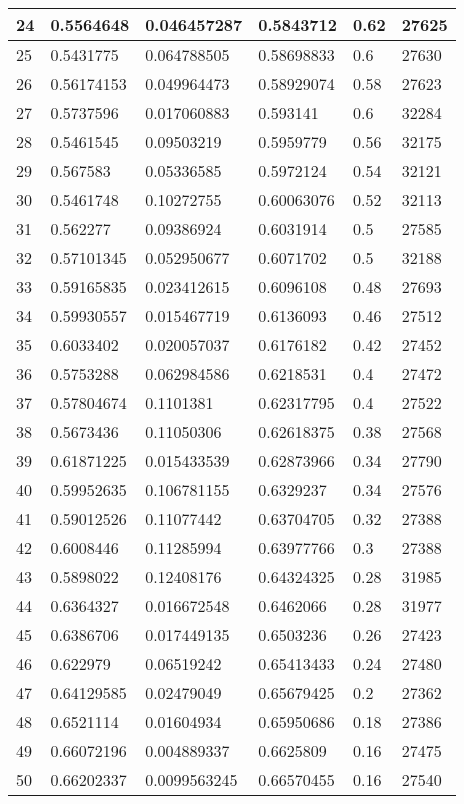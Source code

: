 \begin{longtable}{|l|l|l|l|l|l|}
24 & 0.5564648 & 0.046457287 & 0.5843712 & 0.62 & 27625 \\ \hline 
25 & 0.5431775 & 0.064788505 & 0.58698833 & 0.6 & 27630 \\ \hline 
26 & 0.56174153 & 0.049964473 & 0.58929074 & 0.58 & 27623 \\ \hline 
27 & 0.5737596 & 0.017060883 & 0.593141 & 0.6 & 32284 \\ \hline 
28 & 0.5461545 & 0.09503219 & 0.5959779 & 0.56 & 32175 \\ \hline 
29 & 0.567583 & 0.05336585 & 0.5972124 & 0.54 & 32121 \\ \hline 
30 & 0.5461748 & 0.10272755 & 0.60063076 & 0.52 & 32113 \\ \hline 
31 & 0.562277 & 0.09386924 & 0.6031914 & 0.5 & 27585 \\ \hline 
32 & 0.57101345 & 0.052950677 & 0.6071702 & 0.5 & 32188 \\ \hline 
33 & 0.59165835 & 0.023412615 & 0.6096108 & 0.48 & 27693 \\ \hline 
34 & 0.59930557 & 0.015467719 & 0.6136093 & 0.46 & 27512 \\ \hline 
35 & 0.6033402 & 0.020057037 & 0.6176182 & 0.42 & 27452 \\ \hline 
36 & 0.5753288 & 0.062984586 & 0.6218531 & 0.4 & 27472 \\ \hline 
37 & 0.57804674 & 0.1101381 & 0.62317795 & 0.4 & 27522 \\ \hline 
38 & 0.5673436 & 0.11050306 & 0.62618375 & 0.38 & 27568 \\ \hline 
39 & 0.61871225 & 0.015433539 & 0.62873966 & 0.34 & 27790 \\ \hline 
40 & 0.59952635 & 0.106781155 & 0.6329237 & 0.34 & 27576 \\ \hline 
41 & 0.59012526 & 0.11077442 & 0.63704705 & 0.32 & 27388 \\ \hline 
42 & 0.6008446 & 0.11285994 & 0.63977766 & 0.3 & 27388 \\ \hline 
43 & 0.5898022 & 0.12408176 & 0.64324325 & 0.28 & 31985 \\ \hline 
44 & 0.6364327 & 0.016672548 & 0.6462066 & 0.28 & 31977 \\ \hline 
45 & 0.6386706 & 0.017449135 & 0.6503236 & 0.26 & 27423 \\ \hline 
46 & 0.622979 & 0.06519242 & 0.65413433 & 0.24 & 27480 \\ \hline 
47 & 0.64129585 & 0.02479049 & 0.65679425 & 0.2 & 27362 \\ \hline 
48 & 0.6521114 & 0.01604934 & 0.65950686 & 0.18 & 27386 \\ \hline 
49 & 0.66072196 & 0.004889337 & 0.6625809 & 0.16 & 27475 \\ \hline 
50 & 0.66202337 & 0.0099563245 & 0.66570455 & 0.16 & 27540 \\ \hline 
\end{longtable}